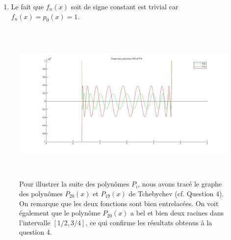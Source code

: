 \begin{enumerate}
\begin{proof}
      Comme les racines sont entrelacées, dans l'intervalle $]-\infty; \xi[$,
      il y a le même nombre de racines de $f_0$ que de racines de $f_1$.
      Ils ont donc changé de signe le même nombre de fois.
      Ils sont dès lors toujours de signe différent comme en $-\infty$.
    \end{proof}

    Soit $\epsilon > 0$ tel que
    $f_1(x), f_0'(x) \neq 0$ $\forall x \in [\xi - \epsilon, \xi]$.
    On sait que $f_0'(\xi)f_0(\xi - \epsilon) < 0$.
    En effet, soit $q(x)$ tel que $q(\xi) \neq 0$ et
    $f_0(x) = (x - \xi) q(x)$.
    Comme $f_0(x) \neq 0$
    $\forall x \in [\xi-\epsilon;\xi[$, on a aussi
    $q(x) \neq 0$ $\forall x \in [\xi - \epsilon;\xi]$.
    On a $f_0'(x) = q(x) + (x - \xi) q'(x)$ d'où
    $f_0(\xi - \epsilon) = -\epsilon q(\xi - \epsilon)$ et
    $f_0'(\xi) = q(\xi)$.
    Comme $q$ est un polynôme, il est continu donc,
    comme il n'y a pas de racine entre $\xi - \epsilon$ et $\xi$,
    $q(\xi - \epsilon)$ et $q(\xi)$ sont de même signe.
    Du même raisonnement, $f_1(\xi - \epsilon)$ et $f_1(\xi)$ sont
    de même signe.
    Comme $\epsilon > 0$, on sait alors que
    $f_0'(\xi)$ et $f_0(\xi - \epsilon)$ sont de signe opposé.
    Comme on savait que $f_0(\xi - \epsilon)$ et $f_1(\xi - \epsilon)$ étati
    de signe opposé, on a bien $f_0'(\xi) f_1(\xi) > 0$.
  \item Le fait que $f_n(x)$ soit de signe constant est trivial car
    $f_n(x) = p_0(x) = 1$.
\end{enumerate}

\begin{figure}
  \centering
  \includegraphics[height=8cm]{fig3.jpg}
  \caption{Pour illustrer la suite des polynômes $P_i$,
  nous avons tracé le graphe des polynômes $P_{20}(x)$ et $P_{19}(x)$ de
  Tchebychev (cf. Question 4).
  On remarque que les deux fonctions sont bien entrelacées.
  On voit également que le polynôme $P_{20}(x)$ a bel et bien deux racines dans
  l'intervalle $[1/2, 3/4]$,
  ce qui confirme les résultats obtenus à la question 4.}
  \label{figure_Tcheb}
\end{figure}
